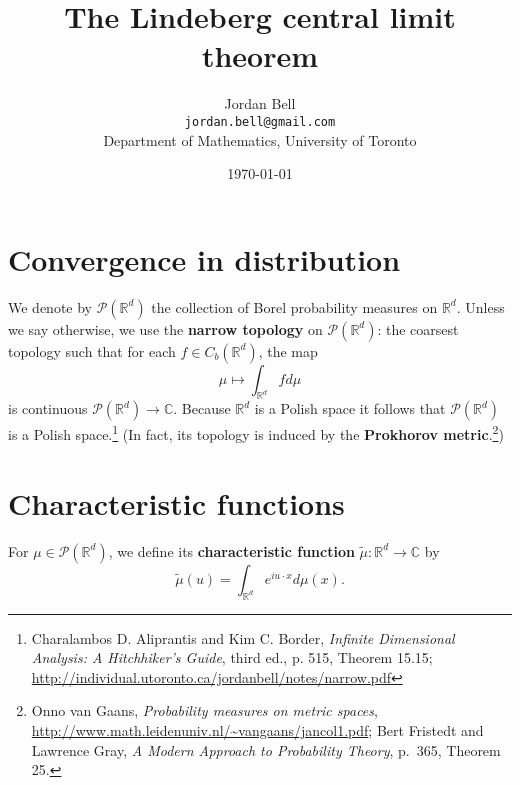 \documentclass{article}
\theoremstyle{definition}
\begin{document}
\title{The  Lindeberg central limit theorem}
\author{Jordan Bell\\ \texttt{jordan.bell@gmail.com}\\Department of Mathematics, University of Toronto}
\date{\today}

\maketitle


\section{Convergence in distribution}
We denote by $\mathscr{P}(\mathbb{R}^d)$ the collection of Borel probability measures on $\mathbb{R}^d$.
Unless we say otherwise, we use the \textbf{narrow topology} on $\mathscr{P}(\mathbb{R}^d)$: the coarsest
topology such that for each $f \in C_b(\mathbb{R}^d)$, the map
\[
\mu \mapsto \int_{\mathbb{R}^d} f d\mu
\]
is continuous $\mathscr{P}(\mathbb{R}^d) \to \mathbb{C}$. 
Because $\mathbb{R}^d$ is a Polish space it follows that $\mathscr{P}(\mathbb{R}^d)$ is a Polish space.\footnote{Charalambos D. Aliprantis and Kim C. Border, {\em Infinite Dimensional Analysis: A Hitchhiker's
Guide}, third ed., p. 515, Theorem 15.15; \url{http://individual.utoronto.ca/jordanbell/notes/narrow.pdf}}
(In fact, its topology is induced by the \textbf{Prokhorov metric}.\footnote{Onno van Gaans, 
{\em Probability measures on metric spaces}, \url{http://www.math.leidenuniv.nl/~vangaans/jancol1.pdf};
Bert Fristedt and Lawrence Gray, {\em A Modern Approach to Probability Theory}, p.~365, Theorem 25.})



\section{Characteristic functions}
For $\mu \in \mathscr{P}(\mathbb{R}^d)$, we define its \textbf{characteristic function}
$\tilde{\mu}:\mathbb{R}^d \to \mathbb{C}$ by
\[
\tilde{\mu}(u) = \int_{\mathbb{R}^d} e^{iu\cdot x} d\mu(x).
\]
\end{document}
